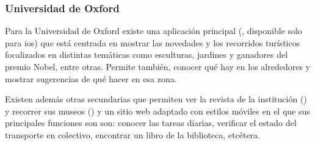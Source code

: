 \subsubsection{Universidad de Oxford}
\label{aplicaciones_existentes_oxford}


Para la Universidad de Oxford\cite{OxfordMobile} existe una aplicación principal
(, disponible solo para \gls{ios}) que está
centrada en mostrar las novedades y los recorridos turísticos focalizados en
distintas temáticas como esculturas, jardines y ganadores del premio Nobel,
entre otras. Permite también, conocer qué hay en los alrededores y mostrar
sugerencias de qué hacer en esa zona.

Existen además otras  secundarias que permiten ver la revista de
la institución () y recorrer sus museos () y un sitio web adaptado con estilos móviles en el que sus  
principales funciones son son: conocer las tareas diarias, verificar el estado
del transporte en colectivo, encontrar un libro de la biblioteca, etcétera.


